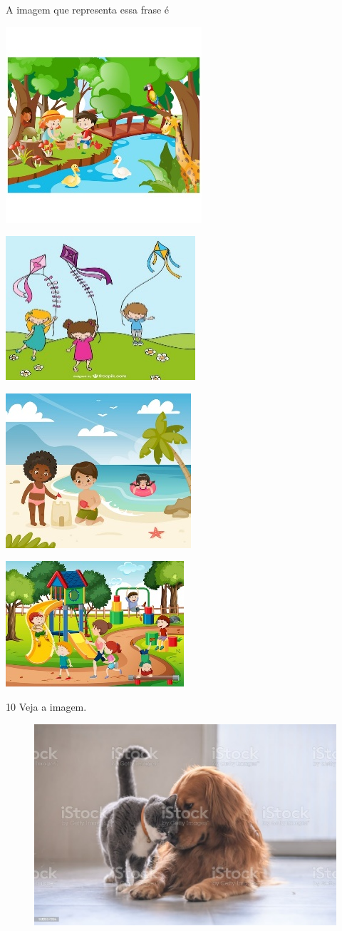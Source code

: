 A imagem que representa essa frase é

\begin{multicols}{2}
\begin{escolha}
\item \includegraphics[width=.35\textwidth]{media/image154.jpeg}

\item \includegraphics[width=.35\textwidth]{media/image155.jpeg}

\item \includegraphics[width=.35\textwidth]{media/image156.jpeg}

\item \includegraphics[width=.35\textwidth]{media/image157.jpeg}
\end{escolha}
\end{multicols}


\num{10} Veja a imagem.

\begin{figure}[htpb!]
\centering
\includegraphics[width=.65\textwidth]{media/image158.jpeg}
\end{figure}

